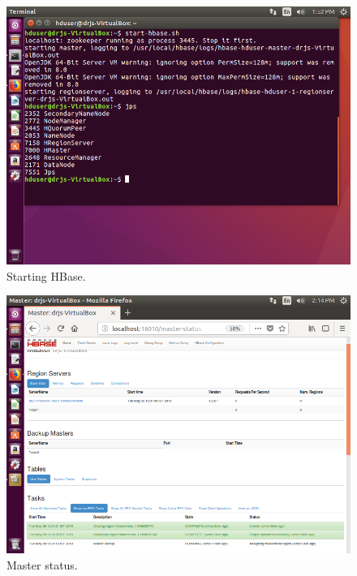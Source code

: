 \documentclass[a4paper,10pt]{article}
\begin{document}
\begin{figure}[h]
	\includegraphics[scale=0.33,center]{10.png}
	\caption{Starting HBase.}
	\label{fig:1}
\end{figure}

\begin{figure}[h]
	\includegraphics[scale=0.33,center]{19.png}
	\caption{Master status.}
	\label{fig:1}
\end{figure}
\end{document}
